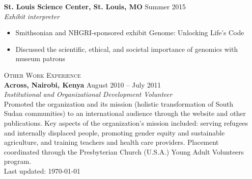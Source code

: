 \documentclass[11pt]{article}
\begin{document}
\textbf{St. Louis Science Center, St. Louis, MO} \hfill Summer 2015 \\
\emph{Exhibit interpreter}
\begin{itemize}
	\item Smithsonian and NHGRI-sponsored exhibit Genome: Unlocking Life's Code
	\item Discussed the scientific, ethical, and societal importance of genomics with museum patrons
\end{itemize}

\hrulefill

\bigskip

\textsc{{\Large Other Work Experience}} \\

\textbf{Across, Nairobi, Kenya} \hfill August 2010 -- July 2011\\
\emph{Institutional and Organizational Development Volunteer} \\
Promoted the organization and its mission (holistic transformation of South Sudan communities) to an international audience through the website and other publications. Key aspects of the organization's mission included: serving refugees and internally displaced people, promoting gender equity and sustainable agriculture, and training teachers and health care providers. Placement coordinated through the Presbyterian Church (U.S.A.) Young Adult Volunteers program. \\

Last updated: \today
\end{document}
